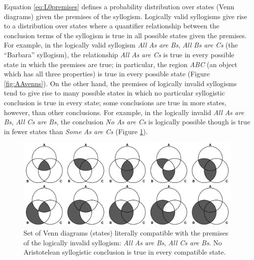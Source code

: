 \documentclass[floatsintext, doc]{apa6}
\begin{document}
Equation \ref{eq:L0premises} defines a probability distribution over states (Venn diagrams) given the premises of the syllogism. 
Logically valid syllogisms give rise to a distribution over states where a quantifier relationship between the conclusion terms of the syllogism is true in all possible states given the premises. 
For example, in the logically valid syllogism  \emph{All As are Bs}, \emph{All Bs are Cs} (the ``Barbara'' syllogism), the relationship \emph{All As are Cs} is true in every possible state in which the premises are true; in particular, the region \emph{ABC} (an object which has all three properties) is true in every possible state (Figure \ref{fig:AAvenns}).
On the other hand, the premises of logically invalid syllogisms tend to give rise to many possible states in which no particular syllogistic conclusion is true in every state; some conclusions are true in more states, however, than other conclusions.
For example, in the logically invalid \emph{All As are Bs}, \emph{All Cs are Bs}, the conclusion \emph{No As are Cs} is logically possible though is true in fewer states than \emph{Some As are Cs} (Figure \ref{fig:EIvenns}).


\begin{figure}[t]
\centering
\includegraphics[width = \textwidth]{figs/diagrams_allAB_allCB.pdf}
\caption{Set of Venn diagrams (states) literally compatible with the premises of the logically invalid syllogism: \emph{All As are Bs}, \emph{All Cs are Bs}. No Aristotelean syllogistic conclusion is true in every compatible state.}
\label{fig:EIvenns}
\end{figure}


\end{document}
